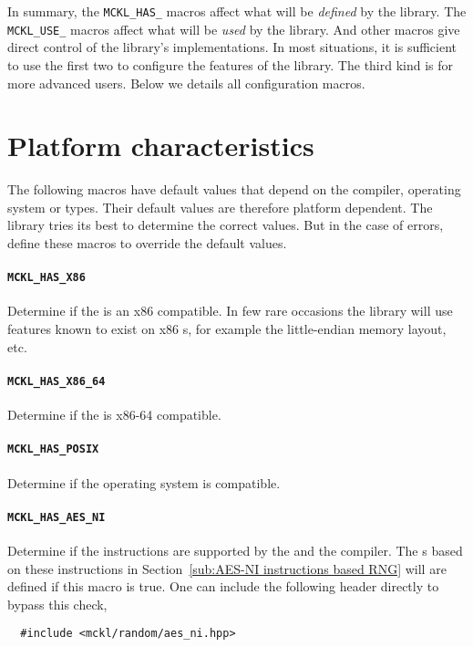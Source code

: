 In summary, the \verb|MCKL_HAS_| macros affect what will be \emph{defined} by
the library. The \verb|MCKL_USE_| macros affect what will be \emph{used} by the
library. And other macros give direct control of the library's implementations.
In most situations, it is sufficient to use the first two to configure the
features of the library. The third kind is for more advanced users. Below we
details all configuration macros.

\section{Platform characteristics}
\label{sec:Platform characteristics}

The following macros have default values that depend on the compiler, operating
system or \cpu types. Their default values are therefore platform dependent.
The library tries its best to determine the correct values. But in the case of
errors, define these macros to override the default values.

\paragraph{\texttt{MCKL\_HAS\_X86}} Determine if the \cpu is an x86 compatible.
In few rare occasions the library will use features known to exist on x86
\cpu{}s, for example the little-endian memory layout, etc.

\paragraph{\texttt{MCKL\_HAS\_X86\_64}} Determine if the \cpu is x86-64
compatible.

\paragraph{\texttt{MCKL\_HAS\_POSIX}} Determine if the operating system is
\posix compatible.

\paragraph{\texttt{MCKL\_HAS\_AES\_NI}} Determine if the \aesni instructions
are supported by the \cpu and the compiler. The \rng{}s based on these
instructions in Section~\ref{sub:AES-NI instructions based RNG} will are
defined if this macro is true. One can include the following header directly to
bypass this check,
\begin{Verbatim}
  #include <mckl/random/aes_ni.hpp>
\end{Verbatim}

